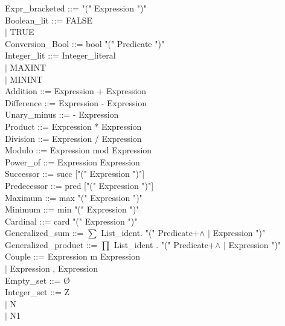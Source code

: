\documentclass[12pt,a4paper,draft]{article}
\begin{document}
{\begin{sloppypar}
Expr\_bracketed  ::= "(" Expression ")" \\
Boolean\_lit   ::=  FALSE\\
   \hspace*{0.20in} $|$  TRUE\\
Conversion\_Bool  ::= bool   "(" Predicate ")" \\
Integer\_lit   ::= Integer\_literal \\
   \hspace*{0.20in} $|$  MAXINT\\
   \hspace*{0.20in} $|$  MININT\\
Addition   ::=  Expression + Expression \\
Difference   ::=  Expression - Expression \\
Unary\_minus  ::= - Expression \\
Product   ::=  Expression * Expression \\
Division   ::=  Expression / Expression \\
Modulo   ::=  Expression mod Expression \\
Power\_of   ::=  Expression Expression \\
Successor   ::=  succ ["(" Expression ")"] \\
Predecessor   ::=  pred ["(" Expression ")"] \\
Maximum   ::=  max "(" Expression ")" \\
Minimum   ::=  min "(" Expression ")" \\
Cardinal   ::= card "(" Expression ")" \\
Generalized\_sum  ::=  $ \sum $ List\_ident. "(" Predicate+$\land$ $|$ Expression ")" \\
Generalized\_product ::=  $\prod$ List\_ident . "(" Predicate+$\land$ $|$ Expression ")" \\
Couple   ::=  Expression m Expression \\
\hspace*{0.20in}   $|$  Expression , Expression \\
Empty\_set   ::=  Ø\\
Integer\_set   ::=  Z\\
  \hspace*{0.20in} $|$  N\\
  \hspace*{0.20in} $|$  N1\\

\end{sloppypar}}
\end{document}
